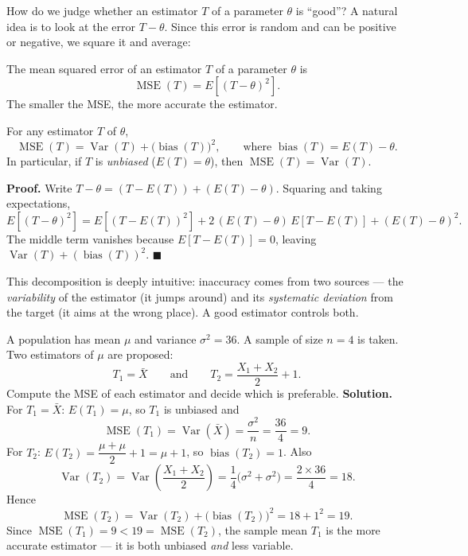 \documentclass[11pt]{article}
\newcommand{\cle}[1]{{\popxbold\color{popdark}#1}}
\begin{document}
How do we judge whether an estimator $T$ of a parameter $\theta$ is ``good''? A natural idea is to look at the error $T - \theta$. Since this error is random and can be positive or negative, we square it and average:

\begin{definition}
The \cle{mean squared error} of an estimator $T$ of a parameter $\theta$ is
\[
\operatorname{MSE}(T) = E\!\left[(T - \theta)^2\right].
\]
The smaller the MSE, the more accurate the estimator.
\end{definition}

\begin{propriete}
For any estimator $T$ of $\theta$,
\[
\operatorname{MSE}(T) = \operatorname{Var}(T) + \bigl(\operatorname{bias}(T)\bigr)^2,
\qquad \text{where } \operatorname{bias}(T) = E(T) - \theta.
\]
In particular, if $T$ is \emph{unbiased} ($E(T) = \theta$), then $\operatorname{MSE}(T) = \operatorname{Var}(T)$.
\end{propriete}

\textbf{Proof.} Write $T - \theta = (T - E(T)) + (E(T) - \theta)$. Squaring and taking expectations,
\[
E[(T-\theta)^2] = E[(T - E(T))^2] + 2\,(E(T)-\theta)\,E[T - E(T)] + (E(T)-\theta)^2.
\]
The middle term vanishes because $E[T - E(T)] = 0$, leaving $\operatorname{Var}(T) + (\operatorname{bias}(T))^2$. $\blacksquare$

This decomposition is deeply intuitive: inaccuracy comes from two sources — the \emph{variability} of the estimator (it jumps around) and its \emph{systematic deviation} from the target (it aims at the wrong place). A good estimator controls both.

\begin{exoresolu}
A population has mean $\mu$ and variance $\sigma^2 = 36$. A sample of size $n = 4$ is taken. Two estimators of $\mu$ are proposed:
\[
T_1 = \bar{X} \qquad \text{and} \qquad T_2 = \frac{X_1 + X_2}{2} + 1.
\]
Compute the MSE of each estimator and decide which is preferable.
\tcblower
\textbf{Solution.} For $T_1 = \bar{X}$: $E(T_1) = \mu$, so $T_1$ is unbiased and
\[
\operatorname{MSE}(T_1) = \operatorname{Var}(\bar{X}) = \frac{\sigma^2}{n} = \frac{36}{4} = 9.
\]
For $T_2$: $E(T_2) = \dfrac{\mu + \mu}{2} + 1 = \mu + 1$, so $\operatorname{bias}(T_2) = 1$. Also
\[
\operatorname{Var}(T_2) = \operatorname{Var}\!\left(\frac{X_1 + X_2}{2}\right) = \frac{1}{4}\bigl(\sigma^2 + \sigma^2\bigr) = \frac{2 \times 36}{4} = 18.
\]
Hence
\[
\operatorname{MSE}(T_2) = \operatorname{Var}(T_2) + \bigl(\operatorname{bias}(T_2)\bigr)^2 = 18 + 1^2 = 19.
\]
Since $\operatorname{MSE}(T_1) = 9 < 19 = \operatorname{MSE}(T_2)$, the sample mean $T_1$ is the more accurate estimator — it is both unbiased \emph{and} less variable.
\end{exoresolu}
\end{document}
